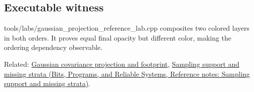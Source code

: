 \subsection{Executable witness}\label{appendix-5f4b2e24c3f6-executable-witness}

tools/labs/gaussian\_projection\_reference\_lab.cpp composites two colored layers in both orders. It proves equal final opacity but different color, making the ordering dependency observable.

Related: \hyperref[appendix-24269cb6977c]{Gaussian covariance projection and footprint}, \href{../01-Bits-Programs-and-Reliable-Systems/main.pdf\#nameddest=appendix-10308c3d753e}{Sampling support and missing strata (Bits, Programs, and Reliable Systems, Reference notes: Sampling support and missing strata)}.
